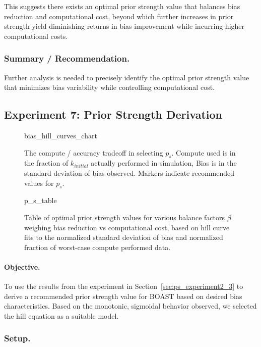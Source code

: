     This suggests there exists an optimal prior strength value that balances bias reduction and computational cost, beyond which further increases in prior strength yield diminishing returns in bias improvement while incurring higher computational costs.

    \subsubsection{Summary / Recommendation.}

    Further analysis is needed to precisely identify the optimal prior strength value that minimizes bias variability while controlling computational cost.
    
\subsection{Experiment 7: Prior Strength Derivation} \label{sec:ps_experiment4}

    \begin{figure}[ht!]
        \centering
        {bias_hill_curves_chart}
        \caption{The compute / accuracy tradeoff in selecting $p_s$. Compute used is in the fraction of $k_{initial}$ actually performed in simulation, Bias is in the standard deviation of bias observed. Markers indicate recommended values for $p_s$.}
        \label{fig:ps_experiment4}
    \end{figure}

    \begin{figure}[ht!]
        \centering
        {p_s_table}
        \caption{Table of optimal prior strength values for various balance factors $\beta$ weighing bias reduction vs computational cost, based on hill curve fits to the normalized standard deviation of bias and normalized fraction of worst-case compute performed data.}
        \label{fig:ps_hill_fit}
    \end{figure}

    \paragraph{Objective.}
    To use the results from the experiment in Section~\ref{sec:ps_experiment2_3} to derive a recommended prior strength value for BOAST based on desired bias characteristics.
    Based on the monotonic, sigmoidal behavior observed, we selected the hill equation as a suitable model.

    \subsubsection{Setup.}

